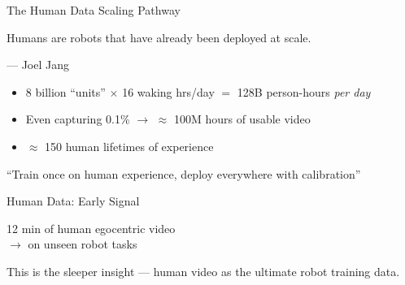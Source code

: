 \begin{frame}{The Human Data Scaling Pathway}
\begin{quotebox}
Humans are robots that have already been deployed at scale.
\end{quotebox}
\hfill --- Joel Jang \citep{jang2026worldmodels}

\vspace{0.5em}
\begin{itemize}
    \item 8 billion ``units'' $\times$ 16 waking hrs/day
          $=$ 128B person-hours \emph{per day}
    \item Even capturing 0.1\% $\rightarrow$
          $\approx$ 100M hours of usable video
    \item $\approx$ 150 human lifetimes of experience
\end{itemize}

\vspace{0.5em}
``Train once on human experience,
deploy everywhere with calibration''
\end{frame}

\begin{frame}{Human Data: Early Signal}
\begin{resultbox}
12 min of human egocentric video\\
$\rightarrow$ 
on unseen robot tasks
\end{resultbox}

\vspace{0.5em}
\begin{softbox}
 This is the sleeper insight ---
human video as the ultimate robot training data.
\end{softbox}
\end{frame}


\begin{frame}[plain]
\begin{center}
\vfill
{\Huge{}}\\[1em]
{\large{}}
\vfill
\end{center}
\end{frame}

